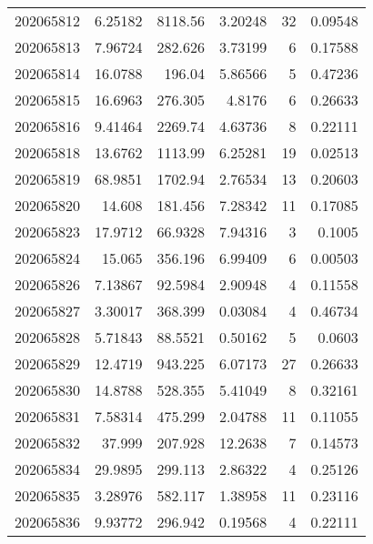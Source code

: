 \begin{tabular}{rrrrrr}
 202065812 &          6.25182 &     8118.56   &            3.20248 &          32 & 0.09548 \\
 202065813 &          7.96724 &      282.626  &            3.73199 &           6 & 0.17588 \\
 202065814 &         16.0788  &      196.04   &            5.86566 &           5 & 0.47236 \\
 202065815 &         16.6963  &      276.305  &            4.8176  &           6 & 0.26633 \\
 202065816 &          9.41464 &     2269.74   &            4.63736 &           8 & 0.22111 \\
 202065818 &         13.6762  &     1113.99   &            6.25281 &          19 & 0.02513 \\
 202065819 &         68.9851  &     1702.94   &            2.76534 &          13 & 0.20603 \\
 202065820 &         14.608   &      181.456  &            7.28342 &          11 & 0.17085 \\
 202065823 &         17.9712  &       66.9328 &            7.94316 &           3 & 0.1005  \\
 202065824 &         15.065   &      356.196  &            6.99409 &           6 & 0.00503 \\
 202065826 &          7.13867 &       92.5984 &            2.90948 &           4 & 0.11558 \\
 202065827 &          3.30017 &      368.399  &            0.03084 &           4 & 0.46734 \\
 202065828 &          5.71843 &       88.5521 &            0.50162 &           5 & 0.0603  \\
 202065829 &         12.4719  &      943.225  &            6.07173 &          27 & 0.26633 \\
 202065830 &         14.8788  &      528.355  &            5.41049 &           8 & 0.32161 \\
 202065831 &          7.58314 &      475.299  &            2.04788 &          11 & 0.11055 \\
 202065832 &         37.999   &      207.928  &           12.2638  &           7 & 0.14573 \\
 202065834 &         29.9895  &      299.113  &            2.86322 &           4 & 0.25126 \\
 202065835 &          3.28976 &      582.117  &            1.38958 &          11 & 0.23116 \\
 202065836 &          9.93772 &      296.942  &            0.19568 &           4 & 0.22111 \\

\end{tabular}
